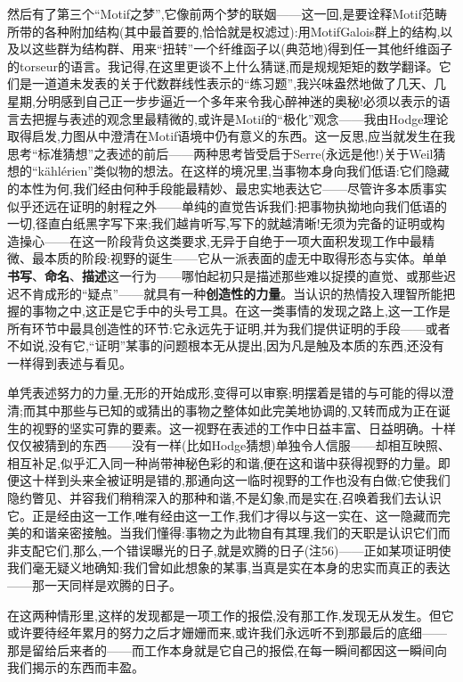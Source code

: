 然后有了第三个“Motif之梦”,它像前两个梦的联姻——这一回,是要诠释Motif范畴所带的各种附加结构(其中最首要的,恰恰就是权滤过):用MotifGalois群上的结构,以及以这些群为结构群、用来“扭转”一个纤维函子以(典范地)得到任一其他纤维函子的torseur\dmark{}的语言。我记得,在这里更谈不上什么猜谜,而是规规矩矩的数学翻译。它们是一道道未发表的关于代数群线性表示的“练习题”,我兴味盎然地做了几天、几星期,分明感到自己正一步步逼近一个多年来令我心醉神迷的奥秘!必须以表示的语言去把握与表述的观念里最精微的,或许是Motif的“极化”观念——我由Hodge理论取得启发,力图从中澄清在Motif语境中仍有意义的东西。这一反思,应当就发生在我思考“标准猜想”之表述的前后——两种思考\dmark{}皆受启于Serre(永远是他!)关于Weil猜想的“kählérien”类似物的想法。在这样的境况里,当事物本身向我们低语:它们隐藏的本性为何,我们经由何种手段能最精妙、最忠实地表达它——尽管许多本质事实似乎还远在证明的射程之外——单纯的直觉告诉我们:把事物执拗地向我们低语的一切,径直白纸黑字写下来;我们越肯听写,写下的就越清晰!无须为完备的证明或构造操心——在这一阶段背负这类要求,无异于自绝于一项大面积发现工作中最精微、最本质的阶段:视野的诞生——它从一派表面的虚无中取得形态与实体。单单\textbf{书写}、\textbf{命名}、\textbf{描述}这一行为——哪怕起初只是描述那些难以捉摸的直觉、或那些迟迟不肯成形的“疑点”——就具有一种\textbf{创造性的力量}。当认识的热情投入理智所能把握的事物之中,这正是它手中的头号工具。在这一类事情的发现之路上,这一工作是所有环节中最具创造性的环节:它永远先于证明,并为我们提供证明的手段——或者不如说,没有它,“证明”某事的问题根本无从提出,因为凡是触及本质的东西,还没有一样得到表述与看见。

单凭表述努力的力量,无形的开始成形,变得可以审察;明摆着是错的与可能的得以澄清;而其中那些与已知的或猜出的事物之整体如此完美地协调的,又转而成为正在诞生的视野的坚实可靠的要素。这一视野在表述的工作中日益丰富、日益明确。十样仅仅被猜到的东西——没有一样(比如Hodge猜想)单独令人信服——却相互映照、相互补足,似乎汇入同一种尚带神秘色彩的和谐,便在这和谐中获得视野的力量。即便这十样到头来全被证明是错的,那通向这一临时视野的工作也没有白做;它使我们隐约瞥见、并容我们稍稍深入的那种和谐,不是幻象,而是实在,召唤着我们去认识它。正是经由这一工作,唯有经由这一工作,我们才得以与这一实在、这一隐藏而完美的和谐亲密接触。当我们懂得:事物之为此物自有其理\dmark{},我们的天职是认识它们而非支配它们,那么,一个错误曝光的日子,就是欢腾的日子(注56)——正如某项证明使我们毫无疑义地确知:我们曾如此想象的某事,当真是实在本身的忠实而真正的表达——那一天同样是欢腾的日子。

在这两种情形里,这样的发现都是一项工作的报偿,没有那工作,发现无从发生。但它或许要待经年累月的努力之后才姗姗而来,或许我们永远听不到那最后的底细——那是留给后来者的——而工作本身就是它自己的报偿,在每一瞬间都因这一瞬间向我们揭示的东西而丰盈。

